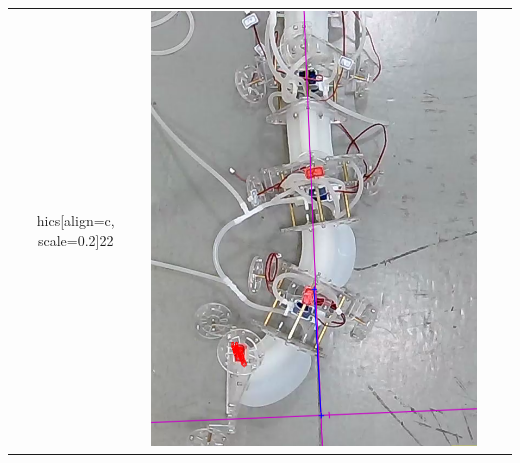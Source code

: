 \documentclass[twoside, 11pt]{article}
\begin{document}
\begin{table} [H]
\begin{tabular}{|c|c|c|c|}
hics[align=c, scale=0.2]{22} & \includegraphics[align=c, scale=0.2]{33}\\

\end{tabular}
\end{table}
\end{document}
